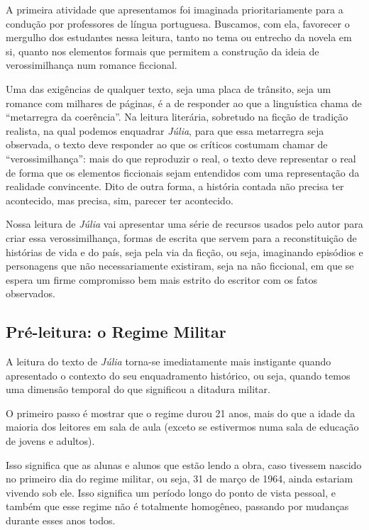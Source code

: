 \documentclass[12pt]{extarticle}
\begin{document}

A primeira atividade que apresentamos foi imaginada prioritariamente
para a condução por professores de língua portuguesa. Buscamos, com ela,
favorecer o mergulho dos estudantes nessa leitura, tanto no tema ou
entrecho da novela em si, quanto nos elementos formais que permitem a
construção da ideia de verossimilhança num romance ficcional.

Uma das exigências de qualquer texto, seja uma placa de trânsito, seja
um romance com milhares de páginas, é a de responder ao que a
linguística chama de ``metarregra da coerência''. Na leitura literária,
sobretudo na ficção de tradição realista, na qual podemos enquadrar
\emph{Júlia}, para que essa metarregra seja observada, o texto deve
responder ao que os críticos costumam chamar de ``verossimilhança'':
mais do que reproduzir o real, o texto deve representar o real de forma
que os elementos ficcionais sejam entendidos com uma representação da
realidade convincente. Dito de outra forma, a história contada não
precisa ter acontecido, mas precisa, sim, parecer ter acontecido.

Nossa leitura de \emph{Júlia} vai apresentar uma série de recursos
usados pelo autor para criar essa verossimilhança, formas de escrita que
servem para a reconstituição de histórias de vida e do país, seja pela
via da ficção, ou seja, imaginando episódios e personagens que não
necessariamente existiram, seja na não ficcional, em que se espera um
firme compromisso bem mais estrito do escritor com os fatos observados.

\subsection{Pré-leitura: o Regime Militar}

A leitura do texto de \emph{Júlia} torna-se imediatamente mais
instigante quando apresentado o contexto do seu enquadramento histórico,
ou seja, quando temos uma dimensão temporal do que significou a ditadura
militar.

O primeiro passo é mostrar que o regime durou 21 anos, mais do que a
idade da maioria dos leitores em sala de aula (exceto se estivermos numa
sala de educação de jovens e adultos).

Isso significa que as alunas e alunos que estão lendo a obra, caso
tivessem nascido no primeiro dia do regime militar, ou seja, 31 de março
de 1964, ainda estariam vivendo sob ele. Isso significa um período longo
do ponto de vista pessoal, e também que esse regime não é totalmente
homogêneo, passando por mudanças durante esses anos todos.
\end{document}
